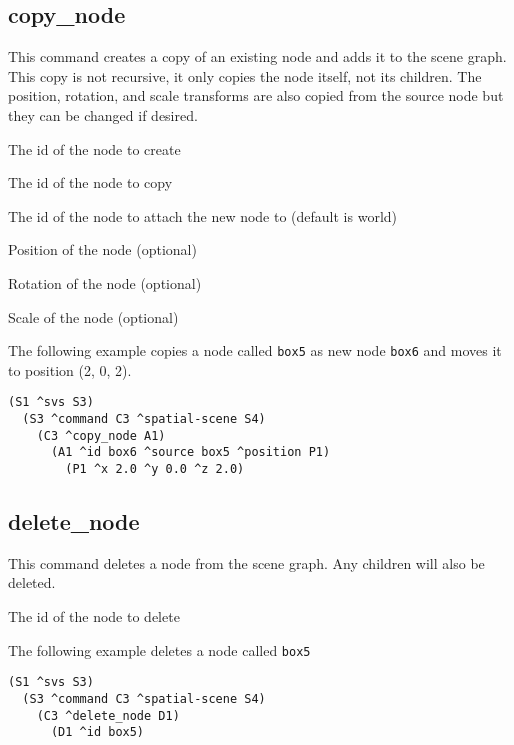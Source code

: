 \subsection{copy\_node}
This command creates a copy of an existing node and adds it to the scene graph. 
This copy is not recursive, it only copies the node itself, not its children. 
The position, rotation, and scale transforms are also copied from the source node
but they can be changed if desired. 
\begin{description}
  \item{} The id of the node to create
  \item{} The id of the node to copy
  \item{} The id of the node to attach the new node to (default is world)
  \item{} Position of the node (optional)
  \item{} Rotation of the node (optional)
  \item{} Scale of the node (optional)
\end{description}

The following example copies a node called \texttt{box5} as new node \texttt{box6}
and moves it to position (2, 0, 2).
\begin{verbatim}
(S1 ^svs S3)
  (S3 ^command C3 ^spatial-scene S4)
    (C3 ^copy_node A1)
      (A1 ^id box6 ^source box5 ^position P1)
        (P1 ^x 2.0 ^y 0.0 ^z 2.0)
\end{verbatim}

\subsection{delete\_node}
This command deletes a node from the scene graph. Any children will also be deleted. 
\begin{description}
  \item{} The id of the node to delete
\end{description}

The following example deletes a node called \texttt{box5}
\begin{verbatim}
(S1 ^svs S3)
  (S3 ^command C3 ^spatial-scene S4)
    (C3 ^delete_node D1)
      (D1 ^id box5)
\end{verbatim}

